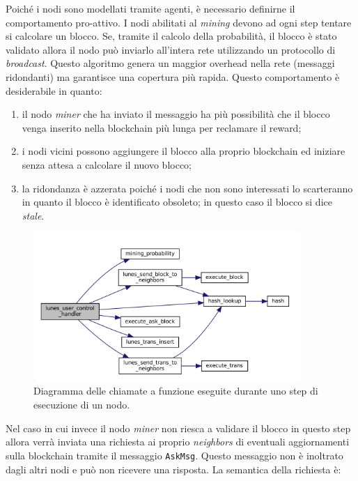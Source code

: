 \begin{code}
Poiché i nodi sono modellati tramite agenti, è necessario definirne il comportamento pro-attivo.\newline
I nodi abilitati al \textit{mining} devono ad ogni step tentare si calcolare un blocco. Se, tramite il calcolo della probabilità, il blocco è stato validato allora il nodo può inviarlo all'intera rete utilizzando un protocollo di \textit{broadcast}. Questo algoritmo genera un maggior overhead nella rete (messaggi ridondanti) ma garantisce una copertura più rapida. Questo comportamento è desiderabile in quanto:
\begin{enumerate}
    \item il nodo \textit{miner} che ha inviato il messaggio ha più possibilità che il blocco venga inserito nella blockchain più lunga per reclamare il reward;
    \item i nodi vicini possono aggiungere il blocco alla proprio blockchain ed iniziare senza attesa a calcolare il nuovo blocco;
    \item la ridondanza è azzerata poiché i nodi che non sono interessati lo scarteranno in quanto il blocco è identificato obsoleto; in questo caso il blocco si dice \textit{stale}.
\end{enumerate}
\begin{figure}[H]
    \centering
    \includegraphics[width=0.9\textwidth]{./images/graphcall_node_routine.png}
    \caption{Diagramma delle chiamate a funzione eseguite durante uno step di esecuzione di un nodo.}
\end{figure}
Nel caso in cui invece il nodo \textit{miner} non riesca a validare il blocco in questo step allora verrà inviata una richiesta ai proprio \textit{neighbors} di eventuali aggiornamenti sulla blockchain tramite il messaggio \texttt{AskMsg}. Questo messaggio non è inoltrato dagli altri nodi e può non ricevere una risposta. La semantica della richiesta è: 
\begin{itemize}

\end{itemize}
\end{code}
